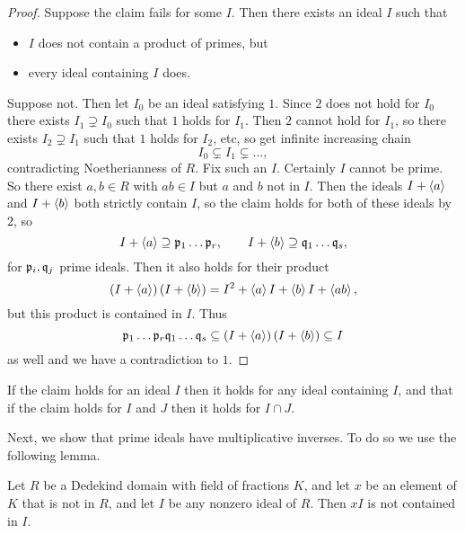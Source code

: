 \begin{proof}
Suppose the claim fails for some $ I $. Then there exists an ideal $ I $ such that
\begin{itemize}
\item $ I $ does not contain a product of primes, but
\item every ideal containing $ I $ does.
\end{itemize}
Suppose not. Then let $ I_0 $ be an ideal satisfying $ 1 $. Since $ 2 $ does not hold for $ I_0 $ there exists $ I_1 \supsetneq I_0 $ such that $ 1 $ holds for $ I_1 $. Then $ 2 $ cannot hold for $ I_1 $, so there exists $ I_2 \supsetneq I_1 $ such that $ 1 $ holds for $ I_2 $, etc, so get infinite increasing chain
$$ I_0 \subsetneq I_1 \subsetneq \dots, $$
contradicting Noetherianness of $ R $. Fix such an $ I $. Certainly $ I $ cannot be prime. So there exist $ a, b \in R $ with $ ab \in I $ but $ a $ and $ b $ not in $ I $. Then the ideals $ I + \left\langle a \right\rangle $ and $ I + \left\langle b \right\rangle $ both strictly contain $ I $, so the claim holds for both of these ideals by $ 2 $, so
$$ I + \left\langle a \right\rangle \supseteq \mathfrak{p}_1 \dots \mathfrak{p}_r, \qquad I + \left\langle b \right\rangle \supseteq \mathfrak{q}_1 \dots \mathfrak{q}_s, $$
for $ \mathfrak{p}_i, \mathfrak{q}_j $ prime ideals. Then it also holds for their product
$$ \left( I + \left\langle a \right\rangle \right)\left( I + \left\langle b \right\rangle \right) = I^2 + \left\langle a \right\rangle I + \left\langle b \right\rangle I + \left\langle ab \right\rangle, $$
but this product is contained in $ I $. Thus
$$ \mathfrak{p}_1 \dots \mathfrak{p}_r\mathfrak{q}_1 \dots \mathfrak{q}_s \subseteq \left( I + \left\langle a \right\rangle \right)\left( I + \left\langle b \right\rangle \right) \subseteq I $$
as well and we have a contradiction to $ 1 $.
\end{proof}

\begin{note*}
If the claim holds for an ideal $ I $ then it holds for any ideal containing $ I $, and that if the claim holds for $ I $ and $ J $ then it holds for $ I \cap J $.
\end{note*}

Next, we show that prime ideals have multiplicative inverses. To do so we use the following lemma.

\begin{lemma}
\label{lem:11.1.7}
Let $ R $ be a Dedekind domain with field of fractions $ K $, and let $ x $ be an element of $ K $ that is not in $ R $, and let $ I $ be any nonzero ideal of $ R $. Then $ xI $ is not contained in $ I $.
\end{lemma}

